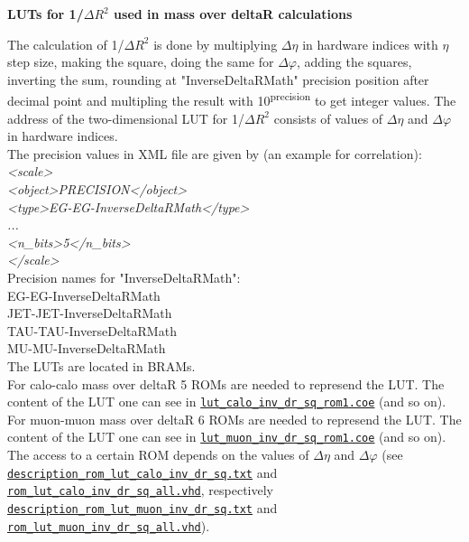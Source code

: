 \textbf{LUTs for 1/$\Delta$$R^2$ used in mass over deltaR calculations}
\label{sec:gtl:calc_luts_inverse_deltaR}

The calculation of 1/$\Delta$$R^2$ is done by multiplying $\Delta\eta$ in hardware indices with $\eta$ step size, making the square, doing the same for $\Delta\varphi$,
adding the squares, inverting the sum, rounding at "InverseDeltaRMath" precision position after decimal point and multipling the result with 10\textsuperscript{\tiny{precision}} to get integer values.
The address of the two-dimensional LUT for 1/$\Delta$$R^2$ consists of values of $\Delta\eta$ and $\Delta\varphi$ in hardware indices.\\

The precision values in XML file are given by (an example for \egamma \egamma correlation):\\
\textit{<scale>\\
    <object>PRECISION</object>\\
    <type>EG-EG-InverseDeltaRMath</type>\\
    ...\\
    <n\_bits>5</n\_bits>\\
</scale>}\\

Precision names for "InverseDeltaRMath":\\
EG-EG-InverseDeltaRMath\\
JET-JET-InverseDeltaRMath\\
TAU-TAU-InverseDeltaRMath\\
MU-MU-InverseDeltaRMath\\

The LUTs are located in BRAMs.\\
For calo-calo mass over deltaR 5 ROMs are needed to represend the LUT. The content of the LUT one can see in \href{\gitbranch/firmware/hdl/ngc/blk_mem_gen_v8_4_4/lut_calo_inv_dr_sq_rom1.coe}{\texttt{\textquotesingle lut\_calo\_inv\_dr\_sq\_rom1.coe\textquotesingle }} (and so on).\\
For muon-muon mass over deltaR 6 ROMs are needed to represend the LUT. The content of the LUT one can see in \href{\gitbranch/firmware/hdl/ngc/blk_mem_gen_v8_4_4/lut_muon_inv_dr_sq_rom1.coe}{\texttt{\textquotesingle lut\_muon\_inv\_dr\_sq\_rom1.coe\textquotesingle }} (and so on).\\
The access to a certain ROM depends on the values of $\Delta\eta$ and $\Delta\varphi$ (see \href{\gitbranch/test_rom_lut_calo_inv_dr_sq_all/doc/description_rom_lut_calo_inv_dr_sq.txt}{\texttt{\textquotesingle description\_rom\_lut\_calo\_inv\_dr\_sq.txt\textquotesingle }} and \href{\gitbranch/firmware/hdl/payload/gtl/common/rom_lut_calo_inv_dr_sq_all.vhd}{\texttt{\textquotesingle rom\_lut\_calo\_inv\_dr\_sq\_all.vhd\textquotesingle }}, respectively\\ 
\href{\gitbranch/test_rom_lut_muon_inv_dr_sq_all/doc/description_rom_lut_muon_inv_dr_sq.txt}{\texttt{\textquotesingle description\_rom\_lut\_muon\_inv\_dr\_sq.txt\textquotesingle }} and\\
\href{\gitbranch/firmware/hdl/payload/gtl/common/rom_lut_muon_inv_dr_sq_all.vhd}{\texttt{\textquotesingle rom\_lut\_muon\_inv\_dr\_sq\_all.vhd\textquotesingle }}).\\

